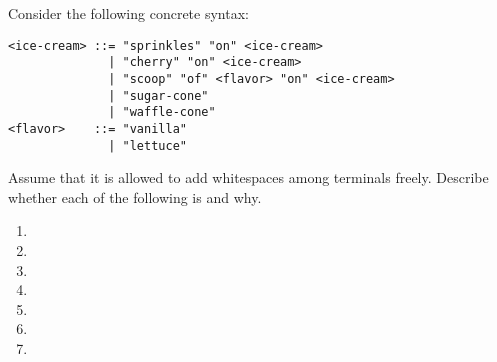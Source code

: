 \begin{exercise}

Consider the following concrete syntax:

\begin{verbatim}
<ice-cream> ::= "sprinkles" "on" <ice-cream>
              | "cherry" "on" <ice-cream>
              | "scoop" "of" <flavor> "on" <ice-cream>
              | "sugar-cone"
              | "waffle-cone"
<flavor>    ::= "vanilla"
              | "lettuce"
\end{verbatim}

Assume that it is allowed to add whitespaces among terminals freely.
Describe whether each of the following is  and why.

\begin{enumerate}
  \item {}
  \item {}
  \item {}
  \item {}
  \item {}
  \item {}
  \item {}
\end{enumerate}

\end{exercise}

